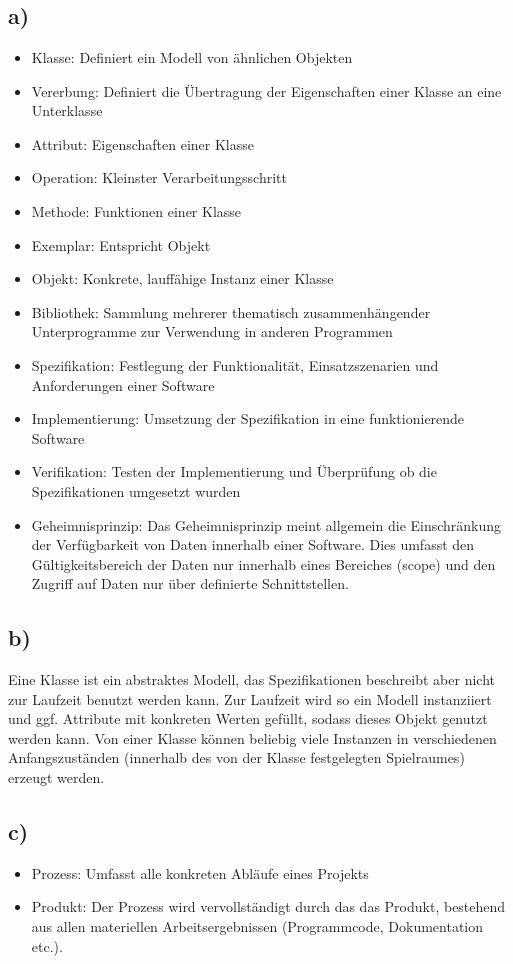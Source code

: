 \section{}
\subsection*{a)}
\begin{itemize}
\item Klasse: Definiert ein Modell von ähnlichen Objekten
\item Vererbung: Definiert die Übertragung der Eigenschaften einer Klasse an eine Unterklasse
\item Attribut: Eigenschaften einer Klasse
\item Operation: Kleinster Verarbeitungsschritt
\item Methode: Funktionen einer Klasse
\item Exemplar: Entspricht Objekt
\item Objekt: Konkrete, lauffähige Instanz einer Klasse
\item Bibliothek: Sammlung mehrerer thematisch zusammenhängender Unterprogramme zur Verwendung in anderen Programmen
\item Spezifikation: Festlegung der Funktionalität, Einsatzszenarien und Anforderungen einer Software \cite{wiki}
\item Implementierung: Umsetzung der Spezifikation in eine funktionierende Software
\item Verifikation: Testen der Implementierung und Überprüfung ob die Spezifikationen umgesetzt wurden
\item Geheimnisprinzip: Das Geheimnisprinzip meint allgemein die Einschränkung der Verfügbarkeit von Daten innerhalb einer Software. Dies umfasst den Gültigkeitsbereich der Daten nur innerhalb eines Bereiches (scope) und den Zugriff auf Daten nur über definierte Schnittstellen. 
\end{itemize}

\subsection*{b)}
Eine Klasse ist ein abstraktes Modell, das Spezifikationen beschreibt aber nicht zur Laufzeit benutzt werden kann. Zur Laufzeit wird so ein Modell instanziiert und ggf. Attribute mit konkreten Werten gefüllt, sodass dieses Objekt genutzt werden kann. Von einer Klasse können beliebig viele Instanzen in verschiedenen Anfangszuständen (innerhalb des von der Klasse festgelegten Spielraumes) erzeugt werden.

\subsection*{c)}
\begin{itemize}
\item Prozess: Umfasst alle konkreten Abläufe eines Projekts
\item Produkt: Der Prozess wird vervollständigt durch das das Produkt, bestehend aus allen materiellen Arbeitsergebnissen (Programmcode, Dokumentation etc.).
\end{itemize}
\printbibliography %


